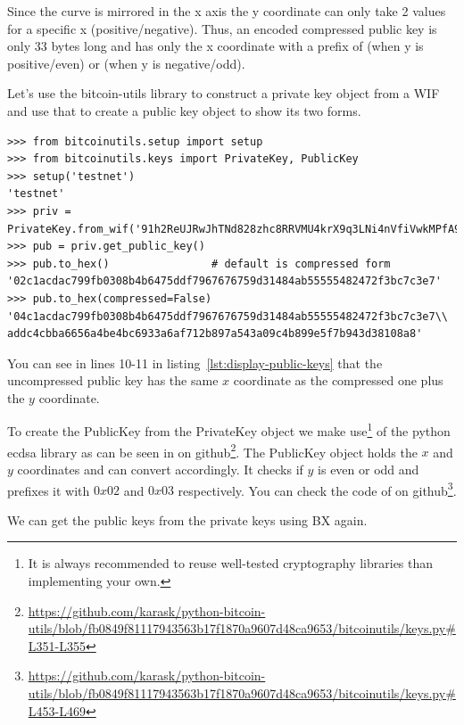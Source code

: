 Since the curve is mirrored in the x axis the y coordinate can only take 2 values for a specific x (positive/negative). Thus, an encoded compressed public key is only 33 bytes long and has only the x coordinate with a prefix of  (when y is positive/even) or  (when y is negative/odd).

Let's use the bitcoin-utils library to construct a private key object from a WIF and use that to create a public key object to show its two forms.

\vspace{1em}
\begin{lstlisting}[style=Python,label={lst:display-public-keys},caption={Python example to generate compressed and uncompressed public keys},captionpos=b]
>>> from bitcoinutils.setup import setup
>>> from bitcoinutils.keys import PrivateKey, PublicKey
>>> setup('testnet')
'testnet'
>>> priv = PrivateKey.from_wif('91h2ReUJRwJhTNd828zhc8RRVMU4krX9q3LNi4nVfiVwkMPfA9p')
>>> pub = priv.get_public_key()
>>> pub.to_hex()                # default is compressed form
'02c1acdac799fb0308b4b6475ddf7967676759d31484ab55555482472f3bc7c3e7'
>>> pub.to_hex(compressed=False)
'04c1acdac799fb0308b4b6475ddf7967676759d31484ab55555482472f3bc7c3e7\\
addc4cbba6656a4be4bc6933a6af712b897a543a09c4b899e5f7b943d38108a8'
\end{lstlisting}
\vspace{1em}

You can see in lines 10-11 in listing~\ref{lst:display-public-keys} that the uncompressed public key has the same $x$ coordinate as the compressed one plus the $y$ coordinate.

To create the PublicKey from the PrivateKey object we make use\footnote{It is always recommended to reuse well-tested cryptography libraries than implementing your own.} of the python ecdsa library as can be seen in  on github\footnote{\url{https://github.com/karask/python-bitcoin-utils/blob/fb0849f81117943563b17f1870a9607d48ca9653/bitcoinutils/keys.py\#L351-L355}}. The PublicKey object holds the $x$ and $y$ coordinates and can convert accordingly. It checks if $y$ is even or odd and prefixes it with $0x02$ and $0x03$ respectively. You can check the code of  on github\footnote{\url{https://github.com/karask/python-bitcoin-utils/blob/fb0849f81117943563b17f1870a9607d48ca9653/bitcoinutils/keys.py\#L453-L469}}.

We can get the public keys from the private keys using BX again.

